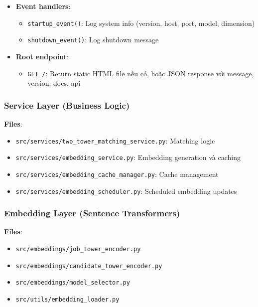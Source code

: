 \begin{itemize}
    \item \textbf{Event handlers}:
    \begin{itemize}
        \item \texttt{startup\_event()}: Log system info (version, host, port, model, dimension)
        \item \texttt{shutdown\_event()}: Log shutdown message
    \end{itemize}
    
    \item \textbf{Root endpoint}:
    \begin{itemize}
        \item \texttt{GET /}: Return static HTML file nếu có, hoặc JSON response với message, version, docs, api
    \end{itemize}
\end{itemize}

\subsubsection{Service Layer (Business Logic)}

\textbf{Files}:
\begin{itemize}
    \item \texttt{src/services/two\_tower\_matching\_service.py}: Matching logic
    \item \texttt{src/services/embedding\_service.py}: Embedding generation và caching
    \item \texttt{src/services/embedding\_cache\_manager.py}: Cache management
    \item \texttt{src/services/embedding\_scheduler.py}: Scheduled embedding updates
\end{itemize}

\subsubsection{Embedding Layer (Sentence Transformers)}

\textbf{Files}:
\begin{itemize}
    \item \texttt{src/embeddings/job\_tower\_encoder.py}
    \item \texttt{src/embeddings/candidate\_tower\_encoder.py}
    \item \texttt{src/embeddings/model\_selector.py}
    \item \texttt{src/utils/embedding\_loader.py}
\end{itemize}

